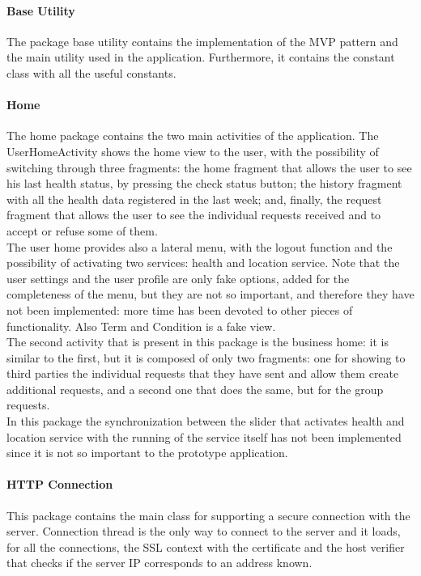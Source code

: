 \paragraph{Base Utility}
The package base utility contains the implementation of the MVP pattern and the main utility used in the application. 
Furthermore, it contains the constant class with all the useful constants.

\paragraph{Home}
The home package contains the two main activities of the application. 
The UserHomeActivity shows the home view to the user, with the possibility of switching through three fragments: the home fragment that allows
the user to see his last health status, by pressing the check status button; the history fragment with all the health data registered in the 
last week; and, finally, the request fragment that allows the user to see the individual requests received and to accept or refuse some of
them. \\
The user home provides also a lateral menu, with the logout function and the possibility of activating two services: health and location
service. 
Note that the user settings and the user profile are only fake options, added for the completeness of the menu, but they are not so important,
and therefore they have not been implemented: more time has been devoted to other pieces of functionality. Also Term and Condition is a fake view. \\
The second activity that is present in this package is the business home: it is similar to the first, but it is composed of only two
fragments: one for showing to third parties the individual requests that they have sent and allow them create additional requests, and a
second one that does the same, but for the group requests.\\
In this package the synchronization between the slider that activates health and location service with the running of the service itself has
not been implemented since it is not so important to the prototype application.

\paragraph{HTTP Connection}
This package contains the main class for supporting a secure connection with the server. 
Connection thread is the only way to connect to the server and it loads, for all the connections, the SSL context with the certificate and the 
host verifier that checks if the server IP corresponds to an address known. 

